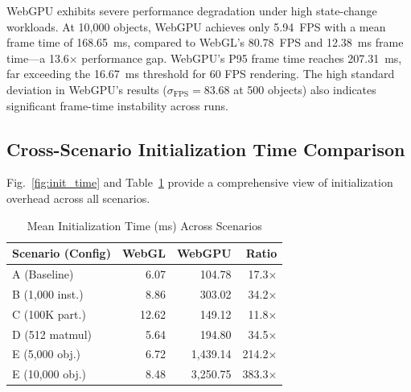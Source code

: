 \documentclass[conference]{IEEEtran}
\begin{document}
WebGPU exhibits severe performance degradation under high state-change workloads. At 10{,}000 objects, WebGPU achieves only 5.94~FPS with a mean frame time of 168.65~ms, compared to WebGL's 80.78~FPS and 12.38~ms frame time---a 13.6$\times$ performance gap. WebGPU's P95 frame time reaches 207.31~ms, far exceeding the 16.67~ms threshold for 60 FPS rendering. The high standard deviation in WebGPU's results ($\sigma_{\text{FPS}} = 83.68$ at 500 objects) also indicates significant frame-time instability across runs.

\subsection{Cross-Scenario Initialization Time Comparison}

Fig.~\ref{fig:init_time} and Table~\ref{tab:init_time} provide a comprehensive view of initialization overhead across all scenarios.

\begin{table}[htbp]
\caption{Mean Initialization Time (ms) Across Scenarios}
\label{tab:init_time}
\centering
\begin{tabular}{@{}lrrr@{}}
\toprule
\textbf{Scenario (Config)} & \textbf{WebGL} & \textbf{WebGPU} & \textbf{Ratio} \\
\midrule
A (Baseline) & 6.07 & 104.78 & 17.3$\times$ \\
B (1{,}000 inst.) & 8.86 & 303.02 & 34.2$\times$ \\
C (100K part.) & 12.62 & 149.12 & 11.8$\times$ \\
D (512 matmul) & 5.64 & 194.80 & 34.5$\times$ \\
E (5{,}000 obj.) & 6.72 & 1{,}439.14 & 214.2$\times$ \\
E (10{,}000 obj.) & 8.48 & 3{,}250.75 & 383.3$\times$ \\
\bottomrule
\end{tabular}
\end{table}
\end{document}

